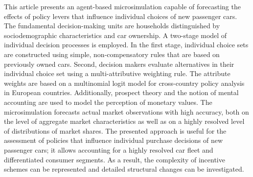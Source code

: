 This article presents an agent-based microsimulation capable of forecasting the effects of policy levers that influence individual choices of new passenger cars. The fundamental decision-making units are households distinguished by sociodemographic characteristics and car ownership. A two-stage model of individual decision processes is employed. In the first stage, individual choice sets are constructed using simple, non-compensatory rules that are based on previously owned cars. Second, decision makers evaluate alternatives in their individual choice set using a multi-attributive weighting rule. The attribute weights are based on a multinomial logit model for cross-country policy analysis in European countries. Additionally, prospect theory and the notion of mental accounting are used to model the perception of monetary values. The microsimulation forecasts actual market observations with high accuracy, both on the level of aggregate market characteristics as well as on a highly resolved level of distributions of market shares. The presented approach is useful for the assessment of policies that influence individual purchase decisions of new passenger cars; it allows accounting for a highly resolved car fleet and differentiated consumer segments. As a result, the complexity of incentive schemes can be represented and detailed structural changes can be investigated.